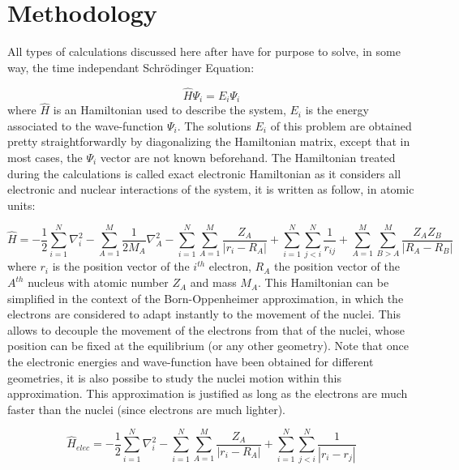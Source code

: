 \documentclass[12pt,a4paper]{report}
\numberwithin{equation}{section}
\begin{document}
\section{Methodology}

All types of calculations discussed here after have for purpose to solve, in some way, the time independant Schr\"odinger Equation:

\begin{equation}
    \hat{H}\Psi_i=E_i\Psi_i
\end{equation}
where $\hat{H}$ is an Hamiltonian used to describe the system, $E_i$ is the energy associated to the wave-function $\Psi_i$. 
The solutions $E_i$ of this problem are obtained pretty straightforwardly by diagonalizing the Hamiltonian matrix, except that in most cases, the $\Psi_i$ vector are not known beforehand.
The Hamiltonian treated during the calculations is called exact electronic Hamiltonian as it considers all electronic and nuclear interactions of the system, it is written as follow, in atomic units:

\begin{equation}\label{Helec}
    \hat{H}=-\frac{1}{2}\sum_{i=1}^{N}\nabla_i^2-\sum_{A=1}^{M}\frac{1}{2M_A}\nabla_A^2%
    -\sum_{i=1}^{N}\sum_{A=1}^{M}\frac{Z_A}{|r_i-R_A|}+\sum_{i=1}^{N}\sum_{j<i}^{N}\frac{1}{r_{ij}}%
    +\sum_{A=1}^{M}\sum_{B>A}^{M}\frac{Z_A Z_B}{|R_A-R_B|}
\end{equation}
where $r_i$ is the position vector of the $i^{th}$ electron, $R_A$ the position vector of the $A^{th}$ nucleus with atomic number $Z_A$ and mass $M_A$.
This Hamiltonian can be simplified in the context of the Born-Oppenheimer approximation, in which the electrons are considered to adapt instantly to the movement of the nuclei.
This allows to decouple the movement of the electrons from that of the nuclei, whose position can be fixed at the equilibrium (or any other geometry).
Note that once the electronic energies and wave-function have been obtained for different geometries, it is also possibe to study the nuclei motion within this approximation.
This approximation is justified as long as the electrons are much faster than the nuclei (since electrons are much lighter). 

\begin{equation}\label{HBO}
    \hat{H}_{elec}=-\frac{1}{2}\sum_{i=1}^{N}\nabla_i^2%
    -\sum_{i=1}^{N}\sum_{A=1}^{M}\frac{Z_A}{|r_i-R_A|}+\sum_{i=1}^{N}\sum_{j<i}^{N}\frac{1}{|r_i-r_j|}%
\end{equation}
\end{document}
